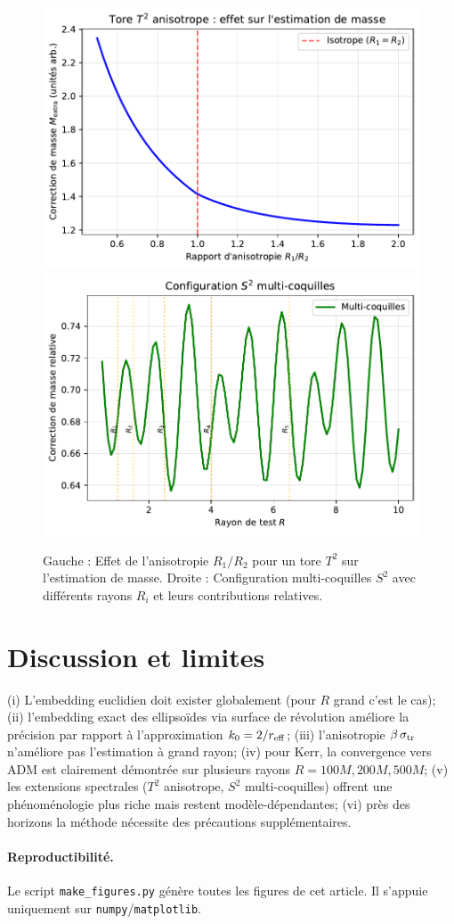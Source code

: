 \documentclass[11pt]{article}
\begin{document}
\begin{figure}[!htb]
\centering
\includegraphics[width=.48\linewidth]{fig_torus_anisotropic.pdf}
\includegraphics[width=.48\linewidth]{fig_sphere_multishell.pdf}
\caption{Gauche : Effet de l'anisotropie $R_1/R_2$ pour un tore $T^2$ sur l'estimation de masse. Droite : Configuration multi-coquilles $S^2$ avec diff\'erents rayons $R_i$ et leurs contributions relatives.}
\end{figure}
\clearpage

\section{Discussion et limites}
(i) L'embedding euclidien doit exister globalement (pour $R$ grand c'est le cas); 
(ii) l'embedding exact des ellipso\"ides via surface de r\'evolution am\'eliore la pr\'ecision par rapport \`a l'approximation $k_0=2/r_{\rm eff}$; 
(iii) l'anisotropie $\beta\,\sigma_{\rm tr}$ n'am\'eliore pas l'estimation \`a grand rayon; 
(iv) pour Kerr, la convergence vers ADM est clairement d\'emontr\'ee sur plusieurs rayons $R = 100M, 200M, 500M$; 
(v) les extensions spectrales ($T^2$ anisotrope, $S^2$ multi-coquilles) offrent une ph\'enom\'enologie plus riche mais restent mod\`ele-d\'ependantes; 
(vi) pr\`es des horizons la m\'ethode n\'ecessite des pr\'ecautions suppl\'ementaires.

\paragraph{Reproductibilit\'e.}
Le script \texttt{make\_figures.py} g\'en\`ere toutes les figures de cet article. Il s'appuie uniquement sur \texttt{numpy}/\texttt{matplotlib}.
\end{document}
